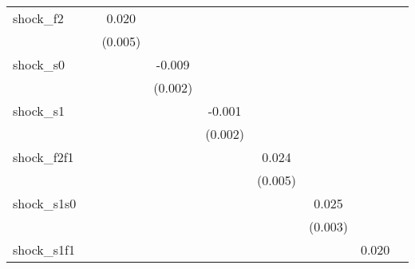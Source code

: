 {\begin{tabular}{l*{8}{c}}
\addlinespace
shock\_f2    &                     &       0.020\sym{***}&                     &                     &                     &                     &                     &                     \\
            &                     &     (0.005)         &                     &                     &                     &                     &                     &                     \\
\addlinespace
shock\_s0    &                     &                     &      -0.009\sym{***}&                     &                     &                     &                     &                     \\
            &                     &                     &     (0.002)         &                     &                     &                     &                     &                     \\
\addlinespace
shock\_s1    &                     &                     &                     &      -0.001         &                     &                     &                     &                     \\
            &                     &                     &                     &     (0.002)         &                     &                     &                     &                     \\
\addlinespace
shock\_f2f1  &                     &                     &                     &                     &       0.024\sym{***}&                     &                     &                     \\
            &                     &                     &                     &                     &     (0.005)         &                     &                     &                     \\
\addlinespace
shock\_s1s0  &                     &                     &                     &                     &                     &       0.025\sym{***}&                     &                     \\
            &                     &                     &                     &                     &                     &     (0.003)         &                     &                     \\
\addlinespace
shock\_s1f1  &                     &                     &                     &                     &                     &                     &       0.020\sym{***}&                     \\

\end{tabular}}
